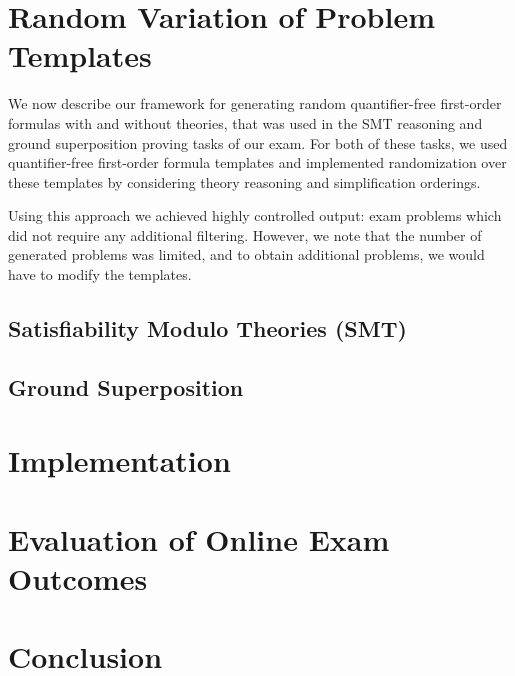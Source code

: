 \documentclass[runningheads]{llncs}
\begin{document}



\section{Random Variation of Problem Templates}\label{sec:smtqf}

We now describe our framework for generating random quantifier-free
first-order formulas with and without theories, that was used in
the SMT reasoning and ground
superposition proving tasks of our exam. For both of these tasks, we
used quantifier-free first-order formula templates and implemented
randomization over these templates by considering theory reasoning and
simplification orderings.

Using this approach we achieved highly controlled output:
exam problems which did not require any additional filtering. However, we
note that the number of generated problems was limited, and to obtain
additional problems, we would have to modify the templates.

\subsection{Satisfiability Modulo Theories (SMT)}\label{sec:smt}





\subsection{Ground Superposition}\label{sec:qf}

\label{sec:gs}




\section{Implementation}\label{sec:implementation}





\section{Evaluation of Online Exam Outcomes}\label{sec:comparison}



\section{Conclusion}
\end{document}
